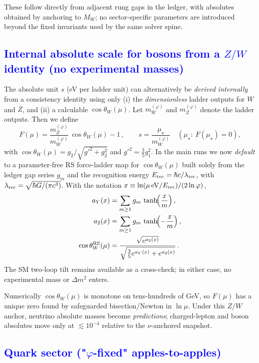 \documentclass[%
amsmath,amssymb,
aps,
prb,
floatfix,showkeys
]{revtex4-2}
\newcommand{\modif}[1]{\textcolor{blue}{#1}}
\begin{document}
These follow directly from adjacent rung gaps in the ledger, with absolutes obtained by anchoring to $M_W$; no sector-specific parameters are introduced beyond the fixed invariants used by the same solver spine.

{\modif{\subsection{Internal absolute scale for bosons from a $Z/W$ identity (no experimental masses)}
\label{subsec:ZW-anchor}}}

The absolute unit $s$ (eV per ladder unit) can alternatively be \emph{derived internally} from a consistency identity using only (i) the \emph{dimensionless} ladder outputs for $W$ and $Z$, and (ii) a calculable $\cos\theta_W(\mu)$. Let $m_W^{(\varphi)}$ and $m_Z^{(\varphi)}$ denote the ladder outputs. Then we define
\begin{equation}
  F(\mu) = \frac{m_Z^{(\varphi)}}{m_W^{(\varphi)}}\,\cos\theta_W(\mu) - 1\,,\qquad
  s = \frac{\mu_\star}{m_W^{(\varphi)}}\quad(\mu_\star:\ F(\mu_\star)=0),
\end{equation}
with $\cos\theta_W(\mu)=g_2/\sqrt{g'^2+g_2^2}$ and $g'^2=\tfrac{3}{5}g_1^2$. In the main runs we now \emph{default} to a parameter-free RS force-ladder map for $\cos\theta_W(\mu)$ built solely from the ledger gap series $g_m$ and the recognition energy $E_{\rm rec}=\hbar c/\lambda_{\rm rec}$, with $\lambda_{\rm rec}=\sqrt{\hbar G/(\pi c^3)}$. With the notation $x\equiv \ln(\mu\,\mathrm{eV}/E_{\rm rec})/(2\ln\varphi)$,
\begin{align}
  a_Y(x) &= \sum_{m\ge1} g_m\,\tanh\!\Bigl(\frac{x}{m}\Bigr)\,,\nonumber\\
  a_2(x) &= \sum_{m\ge1} g_m\,\tanh\!\Bigl(-\frac{x}{m}\Bigr)\,,\\
  \cos\theta_W^{\rm RS}(\mu) &= \frac{\sqrt{e^{a_2(x)}}}{\sqrt{\tfrac{3}{5}e^{a_Y(x)}+e^{a_2(x)}}}\,.\nonumber
\end{align}
The SM two-loop tilt remains available as a cross-check; in either case, no experimental mass or $\Delta m^2$ enters.

Numerically $\cos\theta_W(\mu)$ is monotone on tens-hundreds of GeV, so $F(\mu)$ has a unique zero found by safeguarded bisection/Newton in $\ln\mu$. Under this $Z/W$ anchor, neutrino absolute masses become \emph{predictions}; charged-lepton and boson absolutes move only at $\lesssim10^{-4}$ relative to the $\nu$-anchored snapshot.

{\modif{\subsection{Quark sector ("$\varphi$-fixed" apples-to-apples)}
\label{subsec:quarks}}}
\end{document}
